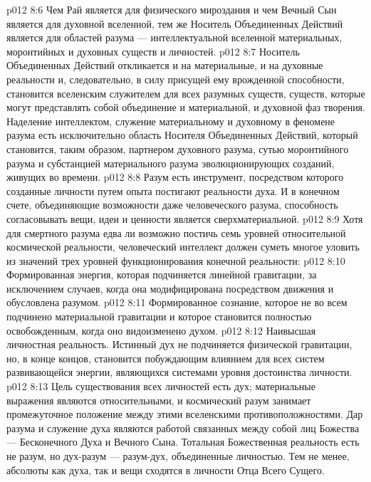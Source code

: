 \vs p012 8:6 \pc Чем Рай является для физического мироздания и чем Вечный Сын является для духовной вселенной, тем же Носитель Объединенных Действий является для областей разума --- интеллектуальной вселенной материальных, моронтийных и духовных существ и личностей.
\vs p012 8:7 Носитель Объединенных Действий откликается и на материальные, и на духовные реальности и, следовательно, в силу присущей ему врожденной способности, становится вселенским служителем для всех разумных существ, существ, которые могут представлять собой объединение и материальной, и духовной фаз творения. Наделение интеллектом, служение материальному и духовному в феномене разума есть исключительно область Носителя Объединенных Действий, который становится, таким образом, партнером духовного разума, сутью моронтийного разума и субстанцией материального разума эволюционирующих созданий, живущих во времени.
\vs p012 8:8 Разум есть инструмент, посредством которого созданные личности путем опыта постигают реальности духа. И в конечном счете, объединяющие возможности даже человеческого разума, способность согласовывать вещи, идеи и ценности является сверхматериальной.
\vs p012 8:9 \pc Хотя для смертного разума едва ли возможно постичь семь уровней относительной космической реальности, человеческий интеллект должен суметь многое уловить из значений трех уровней функционирования конечной реальности:
\vs p012 8:10 \bibnobreakspace {} Формированная энергия, которая подчиняется линейной гравитации, за исключением случаев, когда она модифицирована посредством движения и обусловлена разумом.
\vs p012 8:11 \bibnobreakspace {} Формированное сознание, которое не во всем подчинено материальной гравитации и которое становится полностью освобожденным, когда оно видоизменено духом.
\vs p012 8:12 \bibnobreakspace {} Наивысшая личностная реальность. Истинный дух не подчиняется физической гравитации, но, в конце концов, становится побуждающим влиянием для всех систем развивающейся энергии, являющихся системами уровня достоинства личности.
\vs p012 8:13 \pc Цель существования всех личностей есть дух; материальные выражения являются относительными, и космический разум занимает промежуточное положение между этими вселенскими противоположностями. Дар разума и служение духа являются работой связанных между собой лиц Божества --- Бесконечного Духа и Вечного Сына. Тотальная Божественная реальность есть не разум, но дух\hyp{}разум --- разум\hyp{}дух, объединенные личностью. Тем не менее, абсолюты как духа, так и вещи сходятся в личности Отца Всего Сущего.
